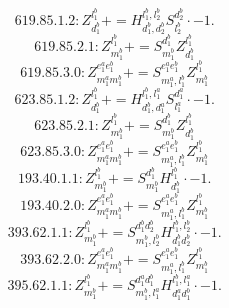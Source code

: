 \documentclass[letterpaper,10pt,fleqn,leqno,onecolumn]{article}
\begin{document}
\begin{equation} \;\;\;\;\;\;  619.85.1.2: Z^{l_{1}^{b}}_{d_{1}^{b}}+=H^{l_{1}^{b},l_{2}^{b}}_{d_{1}^{b},d_{2}^{b}}S^{d_{2}^{b}}_{l_{2}^{b}}\cdot -1. \end{equation}
\begin{equation} \;\;\;\;\;\;  619.85.2.1: Z^{l_{1}^{b}}_{m_{1}^{b}}+=S^{d_{1}^{b}}_{m_{1}^{b}}Z^{l_{1}^{b}}_{d_{1}^{b}} \end{equation}
\begin{equation} \;\;\;\;\;\;  619.85.3.0: Z^{e_{1}^{a}e_{1}^{b}}_{m_{1}^{a}m_{1}^{b}}+=S^{e_{1}^{a}e_{1}^{b}}_{m_{1}^{a},l_{1}^{b}}Z^{l_{1}^{b}}_{m_{1}^{b}} \end{equation}
\begin{equation} \;\;\;\;\;\;  623.85.1.2: Z^{l_{1}^{b}}_{d_{1}^{b}}+=H^{l_{1}^{b},l_{1}^{a}}_{d_{1}^{b},d_{1}^{a}}S^{d_{1}^{a}}_{l_{1}^{a}}\cdot -1. \end{equation}
\begin{equation} \;\;\;\;\;\;  623.85.2.1: Z^{l_{1}^{b}}_{m_{1}^{b}}+=S^{d_{1}^{b}}_{m_{1}^{b}}Z^{l_{1}^{b}}_{d_{1}^{b}} \end{equation}
\begin{equation} \;\;\;\;\;\;  623.85.3.0: Z^{e_{1}^{a}e_{1}^{b}}_{m_{1}^{a}m_{1}^{b}}+=S^{e_{1}^{a}e_{1}^{b}}_{m_{1}^{a},l_{1}^{b}}Z^{l_{1}^{b}}_{m_{1}^{b}} \end{equation}
\begin{equation} \;\;\;\;\;\;  193.40.1.1: Z^{l_{1}^{b}}_{m_{1}^{b}}+=S^{d_{1}^{b}}_{m_{1}^{b}}H^{l_{1}^{b}}_{d_{1}^{b}}\cdot -1. \end{equation}
\begin{equation} \;\;\;\;\;\;  193.40.2.0: Z^{e_{1}^{a}e_{1}^{b}}_{m_{1}^{a}m_{1}^{b}}+=S^{e_{1}^{a}e_{1}^{b}}_{m_{1}^{a},l_{1}^{b}}Z^{l_{1}^{b}}_{m_{1}^{b}} \end{equation}
\begin{equation} \;\;\;\;\;\;  393.62.1.1: Z^{l_{1}^{b}}_{m_{1}^{b}}+=S^{d_{1}^{b}d_{2}^{b}}_{m_{1}^{b},l_{2}^{b}}H^{l_{1}^{b},l_{2}^{b}}_{d_{1}^{b}d_{2}^{b}}\cdot -1. \end{equation}
\begin{equation} \;\;\;\;\;\;  393.62.2.0: Z^{e_{1}^{a}e_{1}^{b}}_{m_{1}^{a}m_{1}^{b}}+=S^{e_{1}^{a}e_{1}^{b}}_{m_{1}^{a},l_{1}^{b}}Z^{l_{1}^{b}}_{m_{1}^{b}} \end{equation}
\begin{equation} \;\;\;\;\;\;  395.62.1.1: Z^{l_{1}^{b}}_{m_{1}^{b}}+=S^{d_{1}^{a}d_{1}^{b}}_{m_{1}^{b},l_{1}^{a}}H^{l_{1}^{b},l_{1}^{a}}_{d_{1}^{a}d_{1}^{b}}\cdot -1. \end{equation}
\end{document}
